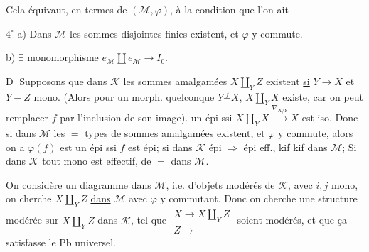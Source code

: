 Cela équivaut, en termes de $(\mathcal M,\varphi)$, à la condition que l'on ait

$4^\circ$ a) Dans $\mathcal M$ les sommes disjointes finies existent, et $\varphi$ y commute.

b) $\exists$ monomorphisme $e_{\mathcal M}\amalg e_{\mathcal M}\longrightarrow I_0$.

\textcircled{D} Supposons que dans $\mathcal K$ les sommes amalgamées $X\amalg_Y Z$ existent \uline{si} $Y\to X$ et $Y-Z$ mono.
(Alors pour un morph. quelconque $Y\mathrel{\overset{f}{-}}X$, $X\amalg_Y X$ existe, car on peut remplacer $f$ par l'inclusion de son image).
un épi ssi $X\amalg_Y X\xrightarrow{\nabla_{X/Y}}X$ est iso. Donc si dans $\mathcal M$ les $=$ types de sommes amalgamées existent, et $\varphi$ y commute, alors on a $\varphi(f)$ est un épi ssi $f$ est épi; si dans $\mathcal K$ épi $\Rightarrow$ épi eff., kif kif dans $\mathcal M$; Si dans $\mathcal K$ tout mono est effectif, de $=$ dans $\mathcal M$.

On considère un diagramme dans $\mathcal M$, i.e. d'objets modérés de $\mathcal K$, 
avec $i,j$ mono, on cherche $X\amalg_Y Z$ \uline{dans} $\mathcal M$ avec $\varphi$ y commutant.
Donc on cherche une structure modérée sur $X\amalg_Y Z$ dans $\mathcal K$,  tel que
$\begin{array}{c}X\longrightarrow X\amalg_Y Z\\ Z\longrightarrow\end{array}$
soient modérés, et que ça satisfasse le Pb universel.


